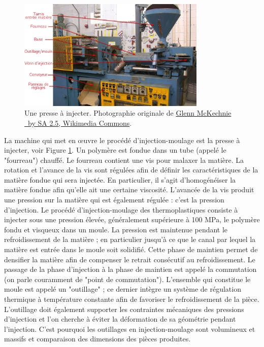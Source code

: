 \begin{figure}[bthp]
	\centering
	\includegraphics[width=0.8\textwidth,height=\textheight,keepaspectratio]{../Chap1/Figures/PlasticsInjectionMoulderJones_annotee.jpg}
	\caption{Une presse à injecter. Photographie originale de \href{https://commons.wikimedia.org/wiki/File:PlasticsInjectionMoulderJones.jpg}{Glenn McKechnie \ccLogo \ by SA \textnormal{2.5}, Wikimedia Commons}.}
	\label{fig:PlasticsInjectionMoulderJones}
\end{figure}

La machine qui met en œuvre le procédé d'injection-moulage est la presse à injecter, voir Figure \ref{fig:PlasticsInjectionMoulderJones}.
Un polymère est fondue dans un tube (appelé le "fourreau") chauffé.  %
Le fourreau contient une vis pour malaxer la matière.  %
La rotation et l'avance de la vis sont régulées afin de définir les caractéristiques de la matière fondue qui sera injectée.
En particulier, il s'agit d'homogénéiser la matière fondue afin qu'elle ait une certaine viscosité.
L'avancée de la vis produit une pression sur la matière qui est également régulée : c'est la pression d'injection.
Le procédé d’injection-moulage des thermoplastiques consiste à injecter sous une pression élevée, généralement supérieure à 100 MPa, le polymère fondu et visqueux dans un moule.
La pression est maintenue pendant le refroidissement de la matière ; en particulier jusqu'à ce que le canal par lequel la matière est entrée dans le moule soit solidifié.
Cette phase de maintien permet de densifier la matière afin de compenser le retrait consécutif au refroidissement.
Le passage de la phase d'injection à la phase de maintien est appelé la commutation (on parle couramment de "point de commutation").
L'ensemble qui constitue le moule est appelé un "outillage" ; ce dernier intègre un système de régulation thermique à température constante afin de favoriser le refroidissement de la pièce.
L'outillage doit également supporter les contraintes mécaniques des pressions d'injection et l'on cherche à éviter la déformation de sa géométrie pendant l'injection.
C'est pourquoi les outillages en injection-moulage sont volumineux et massifs et comparaison des dimensions des pièces produites.

